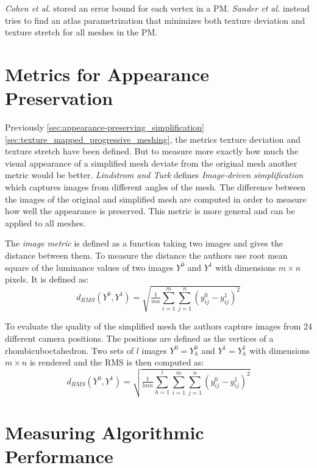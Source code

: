\emph{Cohen et al.} \cite{cohen1998appearance} stored an error bound for each vertex in a PM. \emph{Sander et al.} \cite{sander2001texture} instead tries to find an atlas parametrization that minimizes both texture deviation and texture stretch for all meshes in the PM. 

\section{Metrics for Appearance Preservation} \label{sec:metrics_for_appearance_preservation}
Previously \ref{sec:appearance-preserving_simplification}\ref{sec:texture_mapped_progressive_meshing}, the metrics texture deviation and texture stretch have been defined. But to measure more exactly how much the visual appearance of a simplified mesh deviate from the original mesh another metric would be better. \emph{Lindstrom and Turk} \cite{lindstrom2000image} defines \emph{Image-driven simplification} which captures images from different angles of the mesh. The difference between the images of the original and simplified mesh are computed in order to measure how well the appearance is preserved. This metric is more general and can be applied to all meshes.

The \emph{image metric} is defined as a function taking two images and gives the distance between them. To measure the distance the authors use root mean square of the luminance values of two images $Y^0$ and $Y^1$ with dimensions $m \times n$ pixels. It is defined as:
\begin{equation*}
  d_{RMS}(Y^0,Y^1) = \sqrt{\tfrac{1}{mn}\sum^m_{i=1}\sum^n_{j=1}(y^0_{ij} - y^1_{ij})^2}
\end{equation*}

To evaluate the quality of the simplified mesh the authors capture images from 24 different camera positions. The positions are defined as the vertices of a rhombicuboctahedron. Two sets of $l$ images $Y^0 = {Y^0_h}$ and $Y^1 = {Y^1_h}$ with dimensions $m \times n$ is rendered and the RMS is then computed as:
\begin{equation*}
  d_{RMS}(Y^0,Y^1) = \sqrt{\tfrac{1}{lmn}\sum^l_{h=1}\sum^m_{i=1}\sum^n_{j=1}(y^0_{ij} - y^1_{ij})^2}
\end{equation*}

\section{Measuring Algorithmic Performance} \label{sec:measuring_algorithmic_performance}


